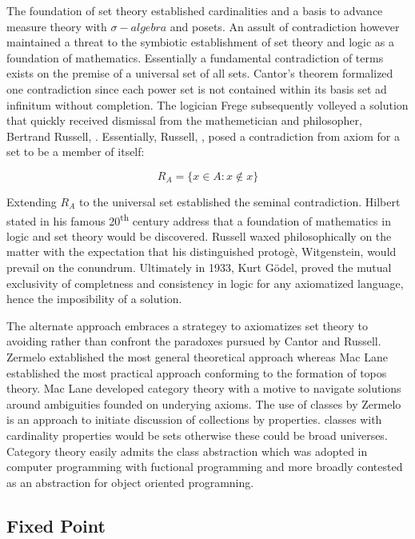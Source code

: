 \documentclass[aps,twocolumn,secnumarabic,nobalancelastpage,amsmath,amssymb,
amsthm,nofootinbib,parskip=full]{revtex4}
\numberwithin{equation}{section}
\begin{document}
The foundation of set theory established cardinalities and a basis
to advance measure theory with $\sigma-algebra$ and posets.
An assult of contradiction however maintained a threat to the symbiotic
establishment of set theory and logic as a foundation of
mathematics. Essentially a fundamental contradiction of terms
exists on the premise of a universal set of all sets.
Cantor's theorem formalized one contradiction since each power
set is not contained within its basis set ad infinitum without
completion. The logician Frege
subsequently volleyed a solution that quickly received dismissal
from the mathemetician and philosopher, Bertrand Russell,
\cite{russell1902}. Essentially, Russell, \cite{russell1902},
posed a contradiction from axiom for a set to be a member of itself:

\begin{equation}\label{eq:russel}
  R_A=\{x\in A: x\notin x\}
\end{equation}

Extending $R_A$ to the universal set established the seminal contradiction.
Hilbert stated in his famous 20\textsuperscript{th}
century address that a foundation of mathematics in
logic and set theory would be discovered.
Russell waxed philosophically
on the matter with the expectation that his distinguished protog\`{e},
Witgenstein, would prevail on the conundrum.
Ultimately in 1933, Kurt G\"{o}del,
proved the mutual exclusivity of completness and consistency in
logic for any axiomatized language, hence the imposibility of a solution.

The alternate approach embraces a strategey to
axiomatizes set theory to avoiding rather than confront
the paradoxes pursued by Cantor and Russell.
Zermelo extablished the most general theoretical approach
whereas Mac Lane established the most practical approach
conforming to the formation of topos theory. Mac Lane
developed category theory with a motive to navigate
solutions around ambiguities founded on underying axioms.
The use of classes by Zermelo is an approach to initiate
discussion of collections by properties. classes with
cardinality properties would be sets otherwise
these could be broad universes. Category theory
easily admits the class abstraction which was
adopted in computer programming with
fuctional programming and more broadly
contested as an abstraction
for object oriented programning.

\subsection{Fixed Point}
\end{document}
